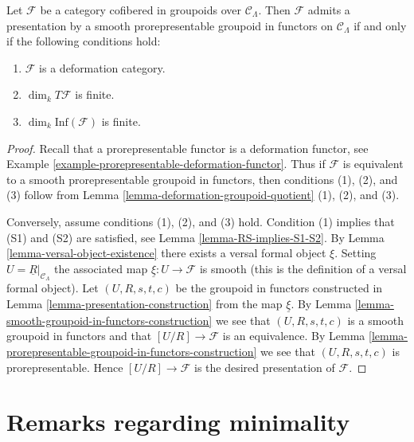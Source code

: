 \begin{theorem}
\label{theorem-presentation-deformation-groupoid}
Let $\mathcal{F}$ be a category cofibered in groupoids over
$\mathcal{C}_\Lambda$. Then $\mathcal{F}$ admits a presentation by a
smooth prorepresentable groupoid in functors on $\mathcal{C}_\Lambda$
if and only if the following conditions hold:
\begin{enumerate}
\item $\mathcal{F}$ is a deformation category.
\item $\dim_k T\mathcal{F}$ is finite.
\item $\dim_k \text{Inf}(\mathcal{F})$ is finite.
\end{enumerate}
\end{theorem}

\begin{proof}
Recall that a prorepresentable functor is a deformation functor, see
Example \ref{example-prorepresentable-deformation-functor}. Thus
if $\mathcal{F}$ is equivalent to a smooth prorepresentable groupoid in
functors, then conditions (1), (2), and (3) follow from
Lemma \ref{lemma-deformation-groupoid-quotient} (1), (2), and (3).

\medskip\noindent
Conversely, assume conditions (1), (2), and (3) hold. Condition (1)
implies that (S1) and (S2) are satisfied, see
Lemma \ref{lemma-RS-implies-S1-S2}.
By
Lemma \ref{lemma-versal-object-existence}
there exists a versal formal object $\xi$. Setting
$U = \underline{R}|_{\mathcal{C}_\Lambda}$ the
associated map $\underline{\xi} : U \to \mathcal{F}$ is smooth (this is
the definition of a versal formal object).
Let $(U, R, s, t, c)$ be the groupoid in functors constructed in
Lemma \ref{lemma-presentation-construction}
from the map $\underline{\xi}$. By
Lemma \ref{lemma-smooth-groupoid-in-functors-construction}
we see that $(U, R, s, t, c)$ is a smooth groupoid in functors and that
$[U/R] \to \mathcal{F}$ is an equivalence. By
Lemma \ref{lemma-prorepresentable-groupoid-in-functors-construction}
we see that $(U, R, s, t, c)$ is prorepresentable.
Hence $[U/R] \to \mathcal{F}$ is the desired presentation of $\mathcal{F}$.
\end{proof}








\section{Remarks regarding minimality}
\label{section-minimality}

